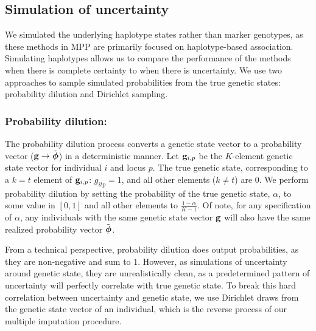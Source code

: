 \subsection{Simulation of uncertainty}

We simulated the underlying haplotype states rather than marker genotypes, as these methods in MPP are primarily focused on haplotype-based association. Simulating haplotypes allows us to compare the performance of the methods when there is complete certainty to when there is uncertainty. We use two approaches to sample simulated probabilities from the true genetic states: probability dilution and Dirichlet sampling.

\subsubsection{Probability dilution:} The probability dilution process converts a genetic state vector to a probability vector ($\mathbf{g} \rightarrow \tilde{\boldsymbol{\phi}}$) in a deterministic manner. Let $\mathbf{g}_{i,p}$ be the $K$-element genetic state vector for individual $i$ and locus $p$. The true genetic state, corresponding to a $k=t$ element of $\mathbf{g}_{i,p}$: $g_{itp} = 1$, and all other elements ($k \neq t$) are 0. We perform probability dilution by setting the probability of the true genetic state, $\alpha$, to some value in $[0, 1]$ and all other elements to $\frac{1 - \alpha}{K - 1}$. Of note, for any specification of $\alpha$, any individuals with the same genetic state vector $\mathbf{g}$ will also have the same realized probability vector $\tilde{\boldsymbol{\phi}}$.

From a technical perspective, probability dilution does output probabilities, as they are non-negative and sum to 1. However, as simulations of uncertainty around genetic state, they are unrealistically clean, as a predetermined pattern of uncertainty will perfectly correlate with true genetic state. To break this hard correlation between uncertainty and genetic state, we use Dirichlet draws from the genetic state vector of an individual, which is the reverse process of our multiple imputation procedure.

